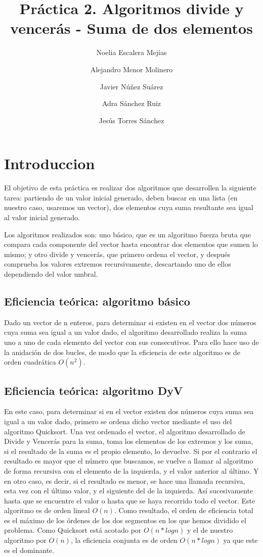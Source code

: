 \documentclass{article}
\title{Práctica 2. Algoritmos divide y vencerás - Suma de dos elementos}
\author{Noelia Escalera Mejías \\
		\and Alejandro Menor Molinero \\
		\and Javier Núñez Suárez \\
		\and Adra Sánchez Ruiz \\
		\and Jesús Torres Sánchez}
\begin{document}
	\maketitle
	\section{Introduccion}
	El objetivo de esta práctica es realizar dos algoritmos que desarrollen la siguiente tarea: partiendo de un valor inicial generado, deben buscar en una lista (en nuestro caso, usaremos un vector), dos elementos cuya suma resultante sea igual al valor inicial generado. 
	
	Los algoritmos realizados son: uno básico, que es un algoritmo fuerza bruta que compara cada componente del vector hasta encontrar dos elementos que sumen lo mismo; y otro divide y vencerás, que primero ordena el vector, y después comprueba los valores extremos recursivamente, descartando uno de ellos dependiendo del valor umbral. 
	
	
	\subsection{Eficiencia teórica: algoritmo básico}
	
	 Dado un vector de n enteros, para determinar si existen en el vector dos números cuya suma sea igual a un valor dado, el algoritmo desarrollado realiza la suma uno a uno de cada
	 elemento del vector con sus consecutivos.
	 Para ello hace uso de la anidación de dos bucles, de modo que la eficiencia de este algoritmo es de orden cuadrática $O(n^2)$.
	
	
	\subsection{Eficiencia teórica: algoritmo DyV}
	
	En este caso, para determinar si en el vector existen dos números cuya suma sea igual a un valor dado, primero se ordena dicho vector mediante el uso del algoritmo Quicksort.
	Una vez ordenado el vector, el algoritmo desarrollado de Divide y Vencerás para la suma, toma los elementos de los extremos y los suma, si el resultado de la suma es el propio elemento, lo
	devuelve. Si por el contrario el resultado es mayor que el número que buscamos, se vuelve a llamar al algoritmo de forma recursiva con el elemento de la izquierda, y el valor anterior al
	último. Y en otro caso, es decir, si el resultado es menor, se hace una llamada recursiva, esta vez con el último valor, y el siguiente del de la izquierda. Así sucesivamente hasta que se
	encuentre el valor o hasta que se haya recorrido todo el vector. Este algoritmo es de orden lineal $O(n)$.
	Como resultado, el orden de eficiencia total es el máximo de los órdenes de los dos segmentos en los que hemos dividido el problema. Como Quicksort está acotado por $O(n*logn)$ y el de
	nuestro algoritmo por $O(n)$, la eficiencia conjunta es de orden $O(n*logn)$ ya que este es el
	dominante.
	
\end{document}
